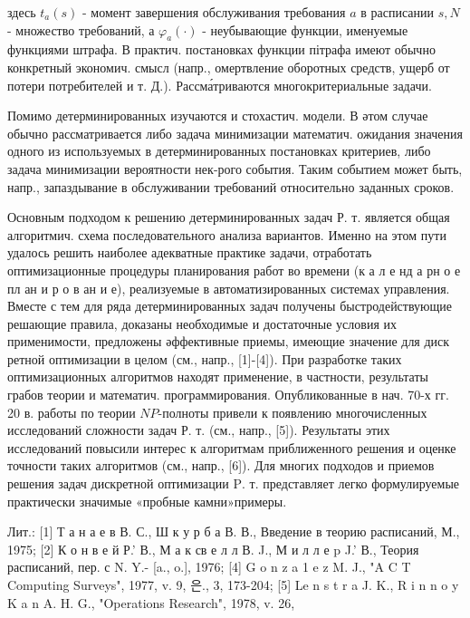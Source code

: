 \documentclass[10pt]{article}
\begin{document}
здесь $t_{a}(s)$ - момент завершения обслуживания требования $a$ в расписании $s, N$ - множество требований, а $\varphi_{a}(\cdot)$ - неубывающие функции, именуемые функциями штрафа. В практич. постановках функции пітрафа имеют обычно конкретный экономич. смысл (напр., омертвление оборотных средств, ущерб от потери потребителей и т. Д.). Рассма́триваются многокритериальные задачи.



Помимо детерминированных изучаются и стохастич. модели. В әтом случае обычно рассматривается либо задача минимизации математич. ожидания значения одного из используемых в детерминированных постановках критериев, либо задача минимизации вероятности нек-рого события. Таким событием может быть, напр., запаздывание в обслуживании требований относительно заданных сроков.



Основным подходом к решению детерминированных задач Р. т. является общая алгоритмич. схема последовательного анализа вариантов. Именно на этом пути удалось решить наиболее адекватные практике задачи, отработать оптимизационные процедуры планирования работ во времени (к а л е нд а рн о е пл ан и р о в ан и е), реализуемые в автоматизированных системах управления. Вместе с тем для ряда детерминированных задач получены быстродействующие решающие правила, доказаны необходимые и достаточные условия их применимости, предложены әффективные приемы, имеющие значение для диск ретной оптимизации в целом (см., напр., [1]-[4]). При разработке таких оптимизационных алгоритмов находят применение, в частности, результаты грабов теории и математич. программирования. Опубликованные в нач. 70-х гг. 20 в. работы по теории $N P$-полноты привели к появлению многочисленных исследований сложности задач Р. т. (см., напр., [5]). Результаты этих исследований повысили интерес к алгоритмам приближенного решения и оценке точности таких алгоритмов (см., напр., [6]). Для многих подходов и приемов решения задач дискретной оптимизации $\mathrm{P}$. т. представляет легко формулируемые практически значимые «пробные камни»примеры.



Лит.: [1] Т а н а е в В. С., Ш к у р б а В. В., Введение в теорию расписаний, М., 1975; [2] К о н в е й Р.' В., М а к св е л л В. J., М и л л е p J.' В., Теория расписаний, пер. с N. Y.- [a., o.], 1976; [4] G o n z a 1 e z M. J., "A C T Computing Surveys", 1977, v. 9, 은., 3, 173-204; [5] Le n s t r a J. K., $\mathrm{R}$ i n n o y K a n A. H. G., "Operations Research", 1978, v. 26,
\end{document}
